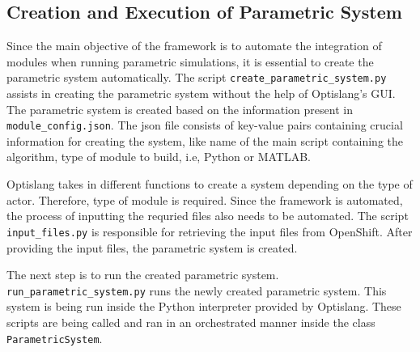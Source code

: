 \subsection{Creation and Execution of Parametric System}
Since the main objective of the framework is to automate the integration of modules when running parametric simulations, it is essential to create the parametric 
system automatically. The script \texttt{create\_parametric\_system.py} assists in creating the parametric system without the help of Optislang's GUI. The 
parametric system is created based on the information present in \texttt{module\_config.json}. The \acrshort{json} file consists of key-value pairs containing 
crucial information for creating the system, like name of the main script containing the algorithm, type of module to build, i.e, Python or MATLAB. 

Optislang takes in different functions to create a system depending on the type of actor. Therefore, type of module is required. Since the framework is automated,
the process of inputting the requried files also needs to be automated. The script \texttt{input\_files.py} is responsible for retrieving the input files from 
OpenShift. 
After providing the input files, the parametric system is created. 

The next step is to run the created parametric system. \texttt{run\_parametric\_system.py} runs the newly created parametric system. This system is being run 
inside the Python interpreter provided by Optislang. These scripts are being called and ran in an orchestrated manner inside the class \texttt{ParametricSystem}.

